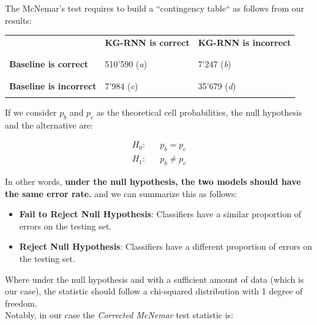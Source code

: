 The McNemar's test requires to build a ``contingency table`` as follows from our results: \\

\begin{table}[H]
 \begin{center}
  \begin{tabular}{ p{4cm} | p{4cm} | p{4cm} }
   & \textbf{KG-RNN is correct}  & \textbf{KG-RNN is incorrect} \\
   && \\ \hline
   && \\
   \textbf{Baseline is correct} & 510'590 (\textit{a}) & 7'247 (\textit{b}) \\
   && \\ \hline
   && \\
   \textbf{Baseline is incorrect} & 7'984 (\textit{c}) & 35'679 (\textit{d}) \\
   && \\ \hline
  \end{tabular}
 \end{center}
\end{table}

If we consider $p_b$ and $p_c$ as the theoretical cell probabilities, the null hypothesis and the alternative are:

\begin{equation*}
 \begin{aligned}
  H_0: &&p_b = p_c \\
  H_1: &&p_b \neq p_c
 \end{aligned}
\end{equation*}

In other words, \textbf{under the null hypothesis, the two models should have the same error rate.} and we can summarize this as follows:

\begin{itemize}
 \item \textbf{Fail to Reject Null Hypothesis}: Classifiers have a similar proportion of errors on the testing set.
 \item \textbf{Reject Null Hypothesis}: Classifiers have a different proportion of errors on the testing set.
\end{itemize}

Where under the null hypothesis and with a sufficient amount of data (which is our case), the statistic should follow a chi-squared distribution with 1 degree of freedom. \\

Notably, in our case the \emph{Corrected McNemar} test statistic is: \\

